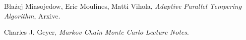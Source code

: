 \documentclass[11pt]{article}
\begin{document}

	
	
	

\begin{thebibliography}{9}

  Błażej Miasojedow, Eric Moulines, Matti Vihola,
  \emph{Adaptive Parallel Tempering Algorithm},
  Arxive.

	Charles J. Geyer,
	\emph{Markov Chain Monte Carlo Lecture Notes}.  
\end{thebibliography}	
\end{document}
